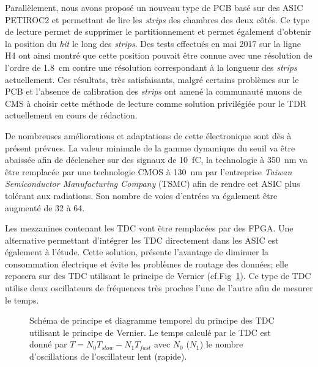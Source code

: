 Parallèlement, nous avons proposé un nouveau type de PCB basé sur des ASIC PETIROC2 et permettant de lire les \textit{strips} des chambres des deux côtés. Ce type de lecture permet de supprimer le partitionnement et permet également d'obtenir la position du \textit{hit} le long des \textit{strips}. Des tests effectués en mai \num{2017} sur la ligne H4 ont ainsi montré que cette position pouvait être connue avec une résolution de l'ordre de \SI{1.8}{\centi\meter} contre une résolution correspondant à la longueur des \textit{strips} actuellement. Ces résultats, très satisfaisants, malgré certains problèmes sur le PCB et l'absence de calibration des \textit{strips} ont amené la communauté muons de CMS à choisir cette méthode de lecture comme solution privilégiée pour le TDR actuellement en cours de rédaction.

De nombreuses améliorations et adaptations de cette électronique sont dès à présent prévues. La valeur minimale de la gamme dynamique du seuil va être abaissée afin de déclencher sur des signaux de \SI{10}{\femto\coulomb}, la technologie  à \SI{350}{\nano\meter} va être remplacée par une technologie CMOS à \SI{130}{\nano\meter} par l'entreprise \textit{Taiwan Semiconductor Manufacturing Company} (TSMC) afin de rendre cet ASIC plus tolérant aux radiations. Son nombre de voies d'entrées va également être augmenté de \num{32} à \num{64}.

Les mezzanines contenant les TDC vont être remplacées par des FPGA. Une alternative permettant d'intégrer les TDC directement dans les ASIC est également à l'étude. Cette solution, présente l'avantage de diminuer la consommation électrique et évite les problèmes de routage des données; elle reposera sur des TDC utilisant le principe de Vernier (cf.Fig~\ref{vernier}). Ce type de TDC utilise deux oscillateurs de fréquences très proches l'une de l'autre afin de mesurer le temps.

\begin{figure}[ht!]
	\centering
	\hfill
	\caption{Schéma de principe et diagramme temporel du principe des TDC utilisant le principe de Vernier. Le temps calculé par le TDC est donné par $T=N_0T_{slow}-N_1T_{fast}$ avec $N_0$ ($N_1$) le nombre d'oscillations de l'oscillateur lent (rapide).}
	\label{vernier}
\end{figure}


